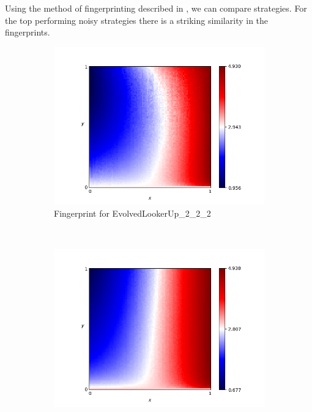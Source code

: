 \documentclass{article}
\begin{document}
Using the method of fingerprinting described in \cite{ashlock2008fingerprinting}
\cite{ashlock2009fingerprint}, we can compare
strategies. For the top performing noisy strategies there is a striking similarity
in the fingerprints.

\begin{figure}[!hbtp]
    \centering
    \begin{subfigure}[t]{.3\textwidth}
        \centering
        \includegraphics[width=\textwidth]{./assets/EvolvedLookerUp2_2_2.png}
        \caption{Fingerprint for EvolvedLookerUp\_2\_2\_2}
    \end{subfigure}%
    ~
    \begin{subfigure}[t]{.3\textwidth}
        \centering
        \includegraphics[width=\textwidth]{./assets/Evolved_HMM_5.png}

\end{subfigure}
\end{figure}
\end{document}
